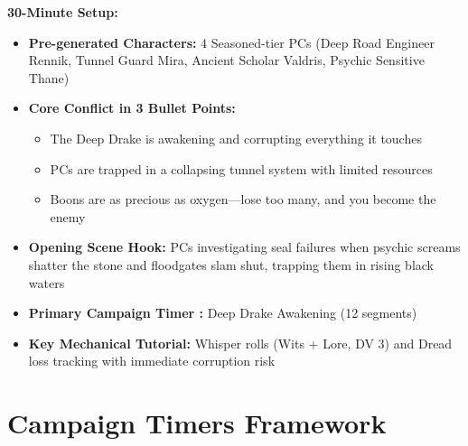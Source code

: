 \documentclass[11pt]{article}
\begin{document}
\textbf{30-Minute Setup:}
\begin{itemize}
\item \textbf{Pre-generated Characters:} 4 Seasoned-tier PCs (Deep Road Engineer Rennik, Tunnel Guard Mira, Ancient Scholar Valdris, Psychic Sensitive Thane)
\item \textbf{Core Conflict in 3 Bullet Points:}
  \begin{itemize}
  \item The Deep Drake is awakening and corrupting everything it touches
  \item PCs are trapped in a collapsing tunnel system with limited resources
  \item Boons are as precious as oxygen---lose too many, and you become the enemy
  \end{itemize}
\item \textbf{Opening Scene Hook:} PCs investigating seal failures when psychic screams shatter the stone and floodgates slam shut, trapping them in rising black waters
\item \textbf{Primary Campaign Timer :} Deep Drake Awakening (12 segments)
\item \textbf{Key Mechanical Tutorial:} Whisper rolls (Wits + Lore, DV 3) and Dread loss tracking with immediate corruption risk
\end{itemize}

\section{Campaign Timers Framework}
\end{document}
